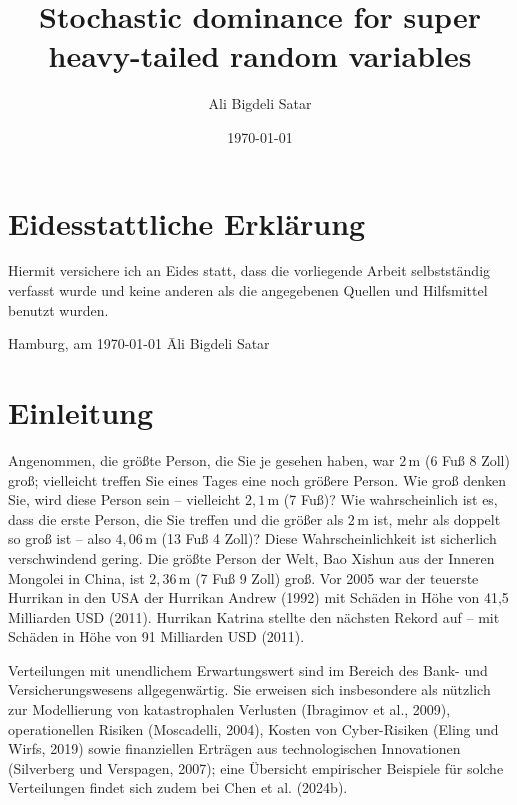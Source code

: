 \documentclass[
12pt,
fancyheadings, %
%
a4paper, 
%
]{tuhhreprt}
\author{Ali Bigdeli Satar}
\title{Stochastic dominance for super heavy-tailed random variables}
\date{\today}
\begin{document}
\frontmatter
\maketitle

\chapter*{Eidesstattliche Erklärung}

Hiermit versichere ich an Eides statt, dass die vorliegende Arbeit selbstständig verfasst wurde und keine anderen als die angegebenen Quellen und Hilfsmittel benutzt wurden.

\vspace{2cm}

\begin{tabbing}
Hamburg, am \today \hspace{5cm} \= Ali Bigdeli Satar
\end{tabbing}

\clearpage

\tableofcontents

\listoffigures{}
\mainmatter
\chapter{Einleitung}
Angenommen, die größte Person, die Sie je gesehen haben, war \(2\,\mathrm{m}\) (6 Fuß 8 Zoll) groß; vielleicht treffen Sie eines Tages eine noch größere Person. Wie groß denken Sie, wird diese Person sein – vielleicht \(2{,}1\,\mathrm{m}\) (7 Fuß)? Wie wahrscheinlich ist es, dass die erste Person, die Sie treffen und die größer als \(2\,\mathrm{m}\) ist, mehr als doppelt so groß ist – also \(4{,}06\,\mathrm{m}\) (13 Fuß 4 Zoll)? Diese Wahrscheinlichkeit ist sicherlich verschwindend gering. Die größte Person der Welt, Bao Xishun aus der Inneren Mongolei in China, ist \(2{,}36\,\mathrm{m}\) (7 Fuß 9 Zoll) groß. Vor 2005 war der teuerste Hurrikan in den USA der Hurrikan Andrew (1992) mit Schäden in Höhe von 41{,}5 Milliarden USD (2011). Hurrikan Katrina stellte den nächsten Rekord auf – mit Schäden in Höhe von 91 Milliarden USD (2011). \cite[Abschnitt 1.1]{cooke2011heavy}


Verteilungen mit unendlichem Erwartungswert sind im Bereich des Bank- und Versicherungswesens allgegenwärtig. Sie erweisen sich insbesondere als nützlich zur Modellierung von katastrophalen Verlusten (Ibragimov et al., 2009), operationellen Risiken (Moscadelli, 2004), Kosten von Cyber-Risiken (Eling und Wirfs, 2019) sowie finanziellen Erträgen aus technologischen Innovationen (Silverberg und Verspagen, 2007); eine Übersicht empirischer Beispiele für solche Verteilungen findet sich zudem bei Chen et al. (2024b)\cite{ChenShneer2024}.
\end{document}
